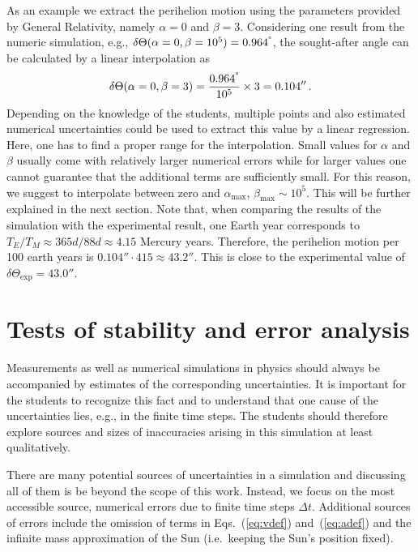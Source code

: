 \documentclass[12pt,ngerman,american]{iopart}
\begin{document}
As an example we  extract the perihelion motion using the parameters provided by General Relativity, namely $\alpha = 0$ and $\beta = 3$.
Considering one result from the numeric simulation, e.g., $\delta\Theta(\alpha = 0, \beta=10^5) = 0.964^{\degree}$, the sought-after angle can be calculated by a linear interpolation as
\begin{equation}
	\delta\Theta (\alpha=0, \beta=3) = \frac{0.964^{\degree}}{10^5} \times 3 = 0.104''
	\, .
\end{equation}
Depending on the knowledge of the students, multiple points and also estimated numerical uncertainties could be used to extract this value by a linear regression.
Here, one has to find a proper range for the interpolation.
Small values for $\alpha$ and $\beta$ usually come with relatively larger numerical errors while for larger values one cannot guarantee that the additional terms are sufficiently small.
For this reason, we suggest to interpolate between zero and $\alpha_{\max}$, $\beta_{\max} \sim 10^5$.
This will be further explained in the next section.
Note that, when comparing the results of the simulation with the experimental result, one Earth year corresponds to $T_E/T_M \approx 365d/88d\approx 4.15$ Mercury years.
Therefore, the perihelion motion per 100 earth years is $0.104''\cdot 415\approx 43.2''$.
This is close to the experimental value of $\delta\Theta_{\mathrm{exp}} = 43.0''$.



\section{Tests of stability and error analysis}\label{sec:stability}
Measurements as well as numerical simulations in physics should always be accompanied by estimates of the corresponding uncertainties.
It is important for the students to recognize this fact and to understand that one cause of the uncertainties lies, e.g., in the finite time steps.
The students should therefore explore sources and sizes of inaccuracies arising in this simulation at least qualitatively.

There are many potential sources of uncertainties in a simulation and discussing all of them is be beyond the scope of this work.
Instead, we focus on the most accessible source, numerical errors due to finite time steps $\Delta t$.
Additional sources of errors include the omission of terms in Eqs.~(\ref{eq:vdef}) and~(\ref{eq:adef}) and the infinite mass approximation of the Sun (i.e.\ keeping the Sun's position fixed).
\end{document}
